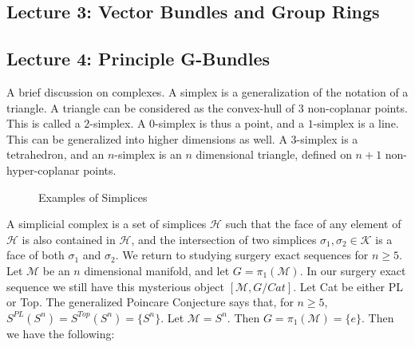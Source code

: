 \documentclass[oneside]{book}
\theoremstyle{mystyle}
\begin{document}
\subsection{Lecture 3: Vector Bundles and Group Rings}
\subsection{Lecture 4: Principle G-Bundles}
A brief discussion on complexes. A simplex is a generalization of the notation of a triangle. A triangle can be considered as the convex-hull of $3$ non-coplanar points. This is called a $2$-simplex. A $0$-simplex is thus a point, and a $1$-simplex is a line. This can be generalized into higher dimensions as well. A $3$-simplex is a tetrahedron, and an $n$-simplex is an $n$ dimensional triangle, defined on $n+1$ non-hyper-coplanar points.
\begin{figure}[H]
    \centering
    \caption[Surgery Theory - Simplices]{Examples of Simplices}
    \label{fig:surgery_theory_simplexes}
\end{figure}
A simplicial complex is a set of simplices $\mathcal{H}$ such that the face of any element of $\mathcal{H}$ is also contained in $\mathcal{H}$, and the intersection of two simplices $\sigma_{1},\sigma_{2}\in \mathcal{K}$ is a face of both $\sigma_{1}$ and $\sigma_{2}$. We return to studying surgery exact sequences for $n\geq 5$. Let $\mathcal{M}$ be an $n$ dimensional manifold, and let $G = \pi_{1}(\mathcal{M})$. In our surgery exact sequence we still have this mysterious object $[\mathcal{M},G/Cat]$. Let Cat be either PL or Top. The generalized Poincare Conjecture says that, for $n\geq 5$, $S^{PL}(S^{n}) = S^{Top}(S^{n}) = \{S^{n}\}$. Let $\mathcal{M} = S^{n}$. Then $G = \pi_{1}(\mathcal{M}) = \{e\}$. Then we have the following:
\end{document}
